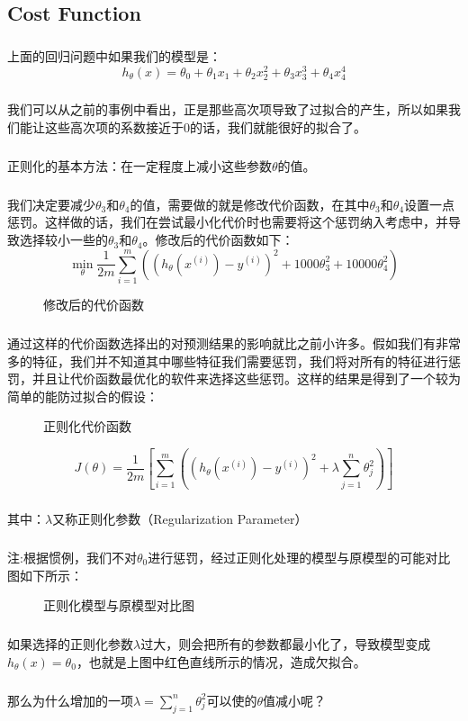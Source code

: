 \documentclass{article}
\begin{document}
\begin{CJK}{UTF8}{gbsn}
\subsection{Cost Function}
\subparagraph{}
上面的回归问题中如果我们的模型是：
\begin{equation}
h_\theta(x)=\theta_0+\theta_1x_1+\theta_2x_2^2+\theta_3x_3^3+\theta_4x_4^4
\end{equation}
\subparagraph{}
我们可以从之前的事例中看出，正是那些高次项导致了过拟合的产生，所以如果我们能让这些高次项的系数接近于0的话，我们就能很好的拟合了。
\subparagraph{}
正则化的基本方法：在一定程度上减小这些参数$\theta$的值。
\subparagraph{}
我们决定要减少$\theta_3$和$\theta_4$的值，需要做的就是修改代价函数，在其中$\theta_3$和$\theta_4$设置一点惩罚。这样做的话，我们在尝试最小化代价时也需要将这个惩罚纳入考虑中，并导致选择较小一些的$\theta_3$和$\theta_4$。修改后的代价函数如下：
\begin{equation}
\min_{\theta}\frac{1}{2m}\sum_{i=1}^m((h_\theta(x^{(i)})-y^{(i)})^2+1000\theta_3^2+10000\theta_4^2)
\end{equation}
\begin{figure}[H]
\caption{修改后的代价函数}
\label{fig:360}
\end{figure}
\subparagraph{}
通过这样的代价函数选择出的对预测结果的影响就比之前小许多。假如我们有非常多的特征，我们并不知道其中哪些特征我们需要惩罚，我们将对所有的特征进行惩罚，并且让代价函数最优化的软件来选择这些惩罚。这样的结果是得到了一个较为简单的能防过拟合的假设：
\begin{figure}[H]
\caption{正则化代价函数}
\label{fig:361}
\end{figure}
\begin{equation}
J(\theta)=\frac{1}{2m}[\sum_{i=1}^m((h_\theta(x^{(i)})-y^{(i)})^2+\lambda\sum_{j=1}^n\theta_j^2)]
\end{equation}
\subparagraph{}
其中：$\lambda$又称正则化参数（Regularization Parameter）
\subparagraph{}
注:根据惯例，我们不对$\theta_0$进行惩罚，经过正则化处理的模型与原模型的可能对比图如下所示：
\begin{figure}[H]
\caption{正则化模型与原模型对比图}
\label{fig:343}
\end{figure}
\subparagraph{}
如果选择的正则化参数$\lambda$过大，则会把所有的参数都最小化了，导致模型变成 $h_\theta(x)=\theta_0$，也就是上图中红色直线所示的情况，造成欠拟合。
\subparagraph{}
那么为什么增加的一项$\lambda=\sum_{j=1}^n\theta_j^2$可以使的$\theta$值减小呢？

\end{CJK}
\end{document}

